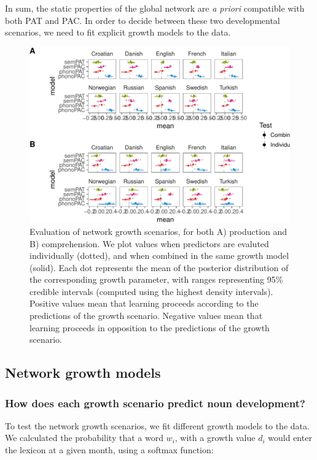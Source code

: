 \documentclass[english,floatsintext,man]{apa6}
\theoremstyle{definition}
\theoremstyle{definition}
\theoremstyle{definition}
\theoremstyle{remark}
\begin{document}
In sum, the static properties of the global network are \emph{a priori}
compatible with both PAT and PAC. In order to decide between these two
developmental scenarios, we need to fit explicit growth models to the
data.

\begin{figure}[!h]
\includegraphics[width=\textwidth]{ms_files/figure-latex/growthPred-1} \caption{Evaluation of network growth scenarios, for both A) production and B) comprehension. We plot values when predictors are evaluted individually (dotted), and when combined in the same growth model (solid). Each dot represents the mean of the posterior distribution of the corresponding growth parameter, with ranges representing 95\% credible intervals (computed using the highest density intervals). Positive values mean that learning proceeds according to the predictions of the growth scenario. Negative values mean that learning proceeds in opposition to the predictions of the growth scenario.}\label{fig:growthPred}
\end{figure}

\subsection{Network growth models}\label{network-growth-models}

\subsubsection{How does each growth scenario predict noun
development?}\label{how-does-each-growth-scenario-predict-noun-development}

To test the network growth scenarios, we fit different growth models to
the data. We calculated the probability that a word \(w_i\), with a
growth value \(d_i\) would enter the lexicon at a given month, using a
softmax function:
\end{document}
